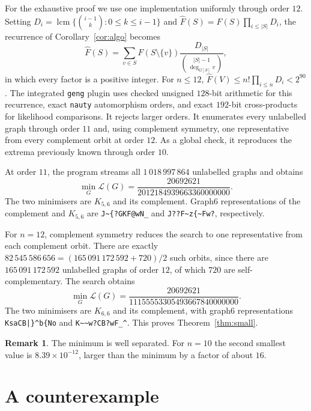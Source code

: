 \documentclass[11pt]{article}
\theoremstyle{definition}
\newtheorem{remark}[theorem]{Remark}
\newcommand{\Lk}{\mathcal{L}}
\newcommand{\bin}[2]{\binom{#1}{#2}}
\begin{document}
For the exhaustive proof we use one implementation uniformly through order
$12$.  Setting
$D_i=\operatorname{lcm}\{\bin{i-1}{k}:0\le k\le i-1\}$ and
$\widehat F(S)=F(S)\prod_{i\le |S|}D_i$, the recurrence of
Corollary~\ref{cor:algo} becomes
\[
\widehat F(S)=\sum_{v\in S}\widehat F(S\setminus\{v\})
\frac{D_{|S|}}{\displaystyle\bin{|S|-1}{\deg_{G[S]}v}},
\]
in which every factor is a positive integer.  For $n\le12$,
$\widehat F(V)\le n!\prod_{i\le n}D_i<2^{90}$.  The integrated
\texttt{geng} plugin uses checked unsigned $128$-bit arithmetic for this
recurrence, exact \texttt{nauty} automorphism orders, and exact $192$-bit
cross-products for likelihood comparisons.  It rejects larger orders.  It
enumerates every unlabelled graph through order $11$ and, using complement
symmetry, one representative from every complement orbit at order $12$.  As
a global check, it reproduces the extrema previously known through order $10$.

At order $11$, the program streams all $1\,018\,997\,864$ unlabelled graphs
and obtains
\[
\min_G\Lk(G)=\frac{20692621}{2012184939663360000000}.
\]
The two minimisers are $K_{5,6}$ and its complement. Graph6 representations
of the complement and $K_{5,6}$ are \verb|J~{?GKF@wN_| and
\verb|J??F~z{~Fw?|, respectively.

For $n=12$, complement symmetry reduces the search to one representative
from each complement orbit. There are exactly
$82\,545\,586\,656=(165\,091\,172\,592+720)/2$ such orbits, since there are
$165\,091\,172\,592$ unlabelled graphs of order $12$, of which $720$ are
self-complementary. The search obtains
\[
\min_G\Lk(G)=\frac{20692621}{11155553305493667840000000}.
\]
The two minimisers are $K_{6,6}$ and its complement, with graph6
representations \verb+KsaCB|}^b{No+ and \verb+K~~w?CB?wF_^+. This proves
Theorem~\ref{thm:small}.

\begin{remark}
The minimum is well separated. For $n=10$ the second smallest value is $8.39\times 10^{-12}$, larger than the minimum by a factor of about $16$.
\end{remark}

\section{A counterexample}\label{sec:counter}
\end{document}
